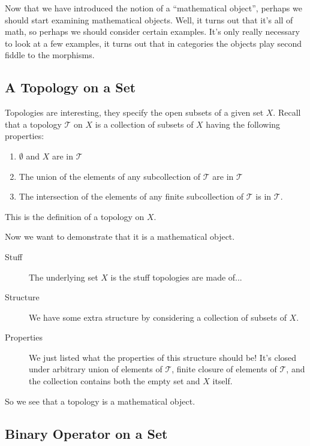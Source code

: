 
Now that we have introduced the notion of a ``mathematical
object'', perhaps we should start examining
mathematical objects. Well, it turns out that it's all of math, so perhaps we
should consider certain examples. It's only really necessary to
look at a few examples, it turns out that in categories the
objects play second fiddle to the morphisms.

\subsection{A Topology on a Set}\label{ex:topologyAsObject}

Topologies are interesting, they specify the open subsets of a
given set $X$. Recall that a topology $\mathcal{T}$ on $X$ is a
collection of subsets of $X$ having the following properties:
\begin{enumerate}
\item $\emptyset$ and $X$ are in $\mathcal{T}$
\item The union of the elements of any subcollection of
  $\mathcal{T}$ are in $\mathcal{T}$
\item The intersection of the elements of any finite
  subcollection of $\mathcal{T}$ is in $\mathcal{T}$.
\end{enumerate}
This is the definition of a topology on $X$.

Now we want to demonstrate that it is a mathematical object.
\begin{description}
\item[Stuff] The underlying set $X$ is the stuff topologies are
  made of...
\item[Structure] We have some extra structure by considering a
  collection of subsets of $X$.
\item[Properties] We just listed what the properties of this
  structure should be! It's closed under arbitrary union of
  elements of $\mathcal{T}$, finite closure of elements of $\mathcal{T}$, and the collection
  contains both the empty set and $X$ itself.
\end{description}
\noindent So we see that a topology is a mathematical object.

\subsection{Binary Operator on a Set}


